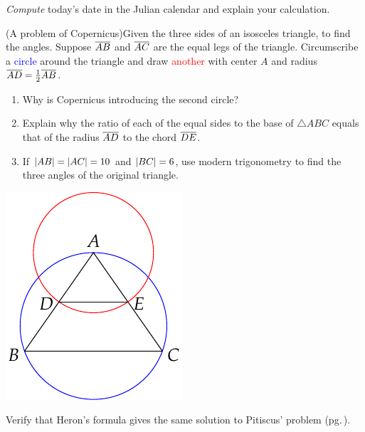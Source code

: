 \begin{exercises}{}{}
	\exstart \emph{Compute} today's date in the Julian calendar and explain your calculation.
	
	\begin{enumerate}\setcounter{enumi}{1}
		\begin{minipage}[t]{0.7\linewidth}\vspace{3pt}
	 		\item%
	 		(A problem of Copernicus)\lstsp Given the three sides of an isosceles triangle, to find the angles.\smallbreak
	  	Suppose $\overline{AB}$ and $\overline{AC}$ are the equal legs of the triangle. Circumscribe a \textcolor{blue}{circle} around the triangle and draw \textcolor{red}{another} with center $A$ and radius $\overline{AD}=\frac 12\overline{AB}$.
			\begin{enumerate}
		  	\item Why is Copernicus introducing the second circle?
		  	\item Explain why the ratio of each of the equal sides to the base of $\triangle ABC$ equals that of the radius $\overline{AD}$ to the chord $\overline{DE}$.
		  	\item If $\left| AB\right|=\left| AC\right|=10$ and $\left| BC\right|=6$, use modern trigonometry to find the three angles of the original triangle.
			\end{enumerate}
		\end{minipage}
		\hfill
		\begin{minipage}[t]{0.28\linewidth}\vspace{3pt}
			\flushright\includegraphics{hw5-copisotri}
		\end{minipage}
	
	  \item Verify that Heron's formula gives the same solution to Pitiscus' problem (pg.\,\pageref{ex:pitiscus}).
	  

\end{enumerate}
\end{exercises}
